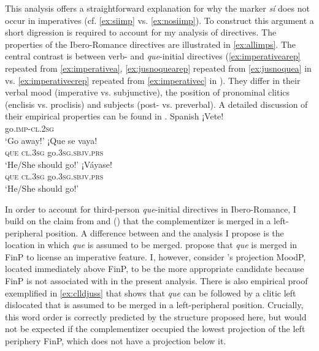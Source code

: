This analysis  offers a straightforward explanation for why the  marker \emph{sí} does not occur in imperatives (cf. \ref{ex:siimp} vs. \ref{ex:nosiimp}). To construct this argument a short digression is required to account for my analysis of  directives. The properties of the Ibero-Romance directives are illustrated in \eqref{ex:allimps}. The central contrast is between verb-  and \emph{que}-initial directives  (\eqref{ex:imperativearep} repeated from \eqref{ex:imperativea},  \eqref{ex:jusnoquearep} repeated from \eqref{ex:jusnoquea}  in   vs. \eqref{ex:imperativecrep} repeated from \eqref{ex:imperativec} in ). They differ in their verbal mood (imperative vs. subjunctive), the position of pronominal clitics (enclisis vs. proclisis) and subjects (post- vs. preverbal).  A detailed discussion of their empirical properties can be found in .
\ea\label{ex:allimps} Spanish
\ea		
\gll ¡Vete! \\
	go.\textsc{imp}-\textsc{cl.2sg}\\
	\glt `Go away!'\label{ex:imperativearep}
	\ex 
\gll ¡Que se vaya! \\
	\textsc{que} \textsc{cl.3sg} go.\textsc{3sg.sbjv.prs}\\
	\glt `He/She should go!'\label{ex:imperativecrep}
\ex
\gll ¡Váyase! \\
	\textsc{que} \textsc{cl.3sg} go.\textsc{3sg.sbjv.prs}\\
	\glt `He/She should go!'\label{ex:jusnoquearep}
\z
\z

In order to account for third-person \emph{que}-initial directives in Ibero-Romance, I build on the claim from \citet{DemonteSoriano2009} and  \citeauthor{Rivero1995} (\citeyear{Rivero1995}) that the complementizer is merged in a left-peripheral position.  A  difference between \citet{DemonteSoriano2009} and the  analysis I propose is the location in which \emph{que} is assumed to be merged. \citet{DemonteSoriano2014} propose that \emph{que} is merged in FinP to license an imperative feature. I, however, consider  \citeauthor{Lohnstein2015}'s  projection MoodP, located immediately above FinP, to be the more appropriate candidate because  FinP is not associated with  in the present analysis. There is also empirical proof exemplified in \eqref{ex:clldjuss} that shows that \emph{que} can be followed by a clitic left dislocated  that is assumed to be merged in a left-peripheral  position. Crucially,  this word order is correctly predicted by the structure proposed here, but would not be expected if the complementizer occupied the lowest projection of the left periphery FinP, which does not have a  projection below it. 

